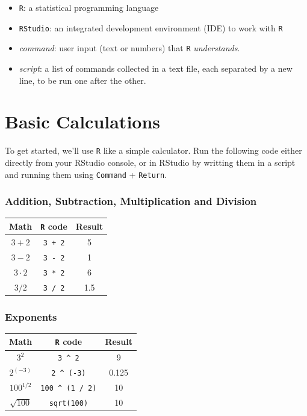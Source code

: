 \documentclass[]{book}
\providecommand{\tightlist}{%
  \setlength{\itemsep}{0pt}\setlength{\parskip}{0pt}}
\theoremstyle{definition}
\theoremstyle{definition}
\theoremstyle{definition}
\theoremstyle{remark}
\begin{document}
\begin{itemize}
\tightlist
\item
  \texttt{R}: a statistical programming language
\item
  \texttt{RStudio}: an integrated development environment (IDE) to work
  with \texttt{R}
\item
  \emph{command}: user input (text or numbers) that \texttt{R}
  \emph{understands}.
\item
  \emph{script}: a list of commands collected in a text file, each
  separated by a new line, to be run one after the other.
\end{itemize}

\section{Basic Calculations}\label{basic-calculations}

To get started, we'll use \texttt{R} like a simple calculator. Run the
following code either directly from your RStudio console, or in RStudio
by writting them in a script and running them using \texttt{Command} +
\texttt{Return}.

\subsubsection*{Addition, Subtraction, Multiplication and
Division}\label{addition-subtraction-multiplication-and-division}

\begin{longtable}[]{@{}ccc@{}}
\toprule
Math & \texttt{R} code & Result\tabularnewline
\midrule
\endhead
\(3 + 2\) & \texttt{3\ +\ 2} & 5\tabularnewline
\(3 - 2\) & \texttt{3\ -\ 2} & 1\tabularnewline
\(3 \cdot2\) & \texttt{3\ *\ 2} & 6\tabularnewline
\(3 / 2\) & \texttt{3\ /\ 2} & 1.5\tabularnewline
\bottomrule
\end{longtable}

\subsubsection*{Exponents}\label{exponents}

\begin{longtable}[]{@{}ccc@{}}
\toprule
Math & \texttt{R} code & Result\tabularnewline
\midrule
\endhead
\(3^2\) & \texttt{3\ \^{}\ 2} & 9\tabularnewline
\(2^{(-3)}\) & \texttt{2\ \^{}\ (-3)} & 0.125\tabularnewline
\(100^{1/2}\) & \texttt{100\ \^{}\ (1\ /\ 2)} & 10\tabularnewline
\(\sqrt{100}\) & \texttt{sqrt(100)} & 10\tabularnewline
\bottomrule
\end{longtable}
\end{document}
